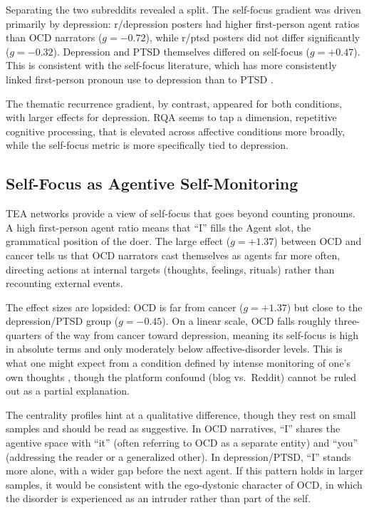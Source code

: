 \documentclass[11pt,a4paper]{article}
\begin{document}
Separating the two subreddits revealed a split. The self-focus gradient was driven primarily by depression: r/depression posters had higher first-person agent ratios than OCD narrators ($g = -0.72$), while r/ptsd posters did not differ significantly ($g = -0.32$). Depression and PTSD themselves differed on self-focus ($g = +0.47$). This is consistent with the self-focus literature, which has more consistently linked first-person pronoun use to depression than to PTSD \citep{rude2004}.

The thematic recurrence gradient, by contrast, appeared for both conditions, with larger effects for depression. RQA seems to tap a dimension, repetitive cognitive processing, that is elevated across affective conditions more broadly, while the self-focus metric is more specifically tied to depression.

\subsection{Self-Focus as Agentive Self-Monitoring}

TEA networks provide a view of self-focus that goes beyond counting pronouns. A high first-person agent ratio means that ``I'' fills the Agent slot, the grammatical position of the doer. The large effect ($g = +1.37$) between OCD and cancer tells us that OCD narrators cast themselves as agents far more often, directing actions at internal targets (thoughts, feelings, rituals) rather than recounting external events.

The effect sizes are lopsided: OCD is far from cancer ($g = +1.37$) but close to the depression/PTSD group ($g = -0.45$). On a linear scale, OCD falls roughly three-quarters of the way from cancer toward depression, meaning its self-focus is high in absolute terms and only moderately below affective-disorder levels. This is what one might expect from a condition defined by intense monitoring of one's own thoughts \citep{salkovskis1985}, though the platform confound (blog vs.\ Reddit) cannot be ruled out as a partial explanation.

The centrality profiles hint at a qualitative difference, though they rest on small samples and should be read as suggestive. In OCD narratives, ``I'' shares the agentive space with ``it'' (often referring to OCD as a separate entity) and ``you'' (addressing the reader or a generalized other). In depression/PTSD, ``I'' stands more alone, with a wider gap before the next agent. If this pattern holds in larger samples, it would be consistent with the ego-dystonic character of OCD, in which the disorder is experienced as an intruder rather than part of the self.
\end{document}
